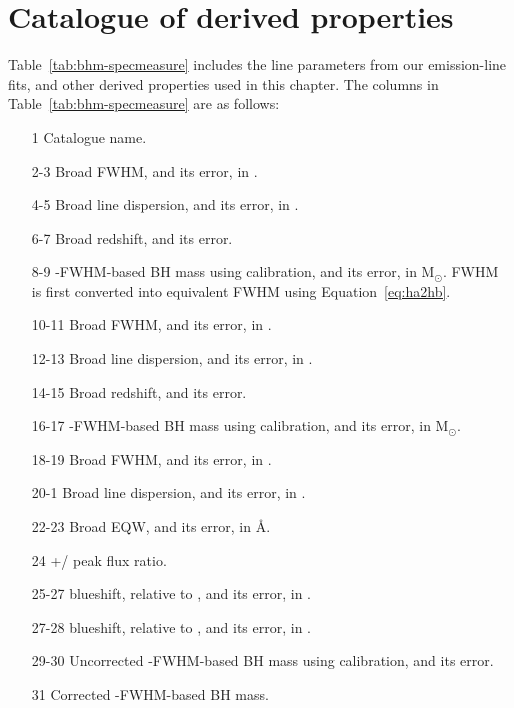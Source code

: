 \section{Catalogue of derived properties}

Table~\ref{tab:bhm-specmeasure} includes the line parameters from our emission-line fits, and other derived properties used in this chapter.
The columns in Table~\ref{tab:bhm-specmeasure} are as follows:

\begin{itemize}

 \item[1] Catalogue name.

 \item[2-3] Broad \ha FWHM, and its error, in \kms.

 \item[4-5] Broad \ha line dispersion, and its error, in \kms.

 \item[6-7] Broad \ha redshift, and its error.

 \item[8-9] \hans-FWHM-based BH mass using \citet{vestergaard06} calibration, and its error, in M$_\odot$. \ha FWHM is first converted into equivalent \hb FWHM using Equation~\ref{eq:ha2hb}.

 \item[10-11] Broad \hb FWHM, and its error, in \kms.

 \item[12-13] Broad \hb line dispersion, and its error, in \kms.

 \item[14-15] Broad \hb redshift, and its error.

 \item[16-17] \hbns-FWHM-based BH mass using \citet{vestergaard06} calibration, and its error, in M$_\odot$.

 \item[18-19] Broad  FWHM, and its error, in \kms.

 \item[20-1] Broad  line dispersion, and its error, in \kms.

 \item[22-23] Broad  EQW, and its error, in \AA.

 \item[24] +/ peak flux ratio.

 \item[25-27]  blueshift, relative to \hans, and its error, in \kms.

 \item[27-28]  blueshift, relative to \hbns, and its error, in \kms.

 \item[29-30] Uncorrected -FWHM-based BH mass using \citet{vestergaard06} calibration, and its error.

 \item[31] Corrected -FWHM-based BH mass.

\end{itemize}


